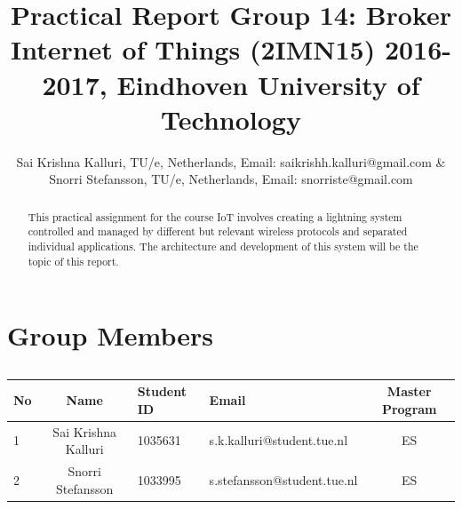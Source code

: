 \documentclass[11pt]{article}
\begin{document}
\title{Practical Report Group 14: Broker\\ {\fontsize{13}{0}\selectfont Internet of Things (2IMN15) 2016-2017, Eindhoven University of Technology}}

\author{Sai Krishna Kalluri, TU/e, Netherlands, 
		Email: saikrishh.kalluri@gmail.com \& \\  Snorri Stefansson, TU/e, Netherlands, Email: snorriste@gmail.com}
\maketitle



\begin{abstract}
	This practical assignment for the course IoT involves creating a lightning system controlled and managed by different but relevant wireless protocols and separated individual applications. The architecture and development of this system will be the topic of this report.\\	
\end{abstract}
\pagebreak
\tableofcontents

\pagebreak

\section{Group Members}
\begin{table}[htbp]
	\caption{}
	\begin{tabular}{lcllc}
		\toprule
		No & Name & Student ID & Email & Master Program \\ 
		\midrule
		1 & Sai Krishna Kalluri & 1035631 & s.k.kalluri@student.tue.nl & ES \\ 
		2 & Snorri Stefansson & 1033995 & s.stefansson@student.tue.nl & ES \\ 
		\toprule
	\end{tabular}
	\label{}
\end{table}
\end{document}
